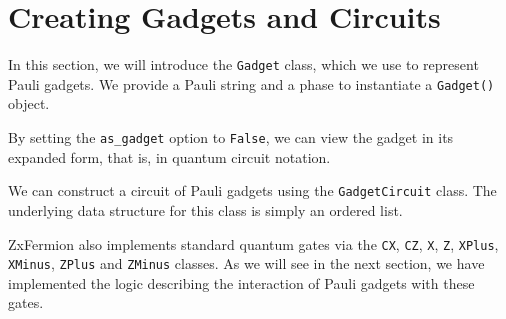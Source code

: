 \section{Creating Gadgets and Circuits}

In this section, we will introduce the \lstinline{Gadget} class, which we use to represent Pauli gadgets. We provide a Pauli string and a phase to instantiate a \lstinline{Gadget()} object.


By setting the \lstinline{as_gadget} option to \lstinline{False}, we can view the gadget in its expanded form, that is, in quantum circuit notation.


We can construct a circuit of Pauli gadgets using the \lstinline{GadgetCircuit} class. The underlying data structure for this class is simply an ordered list.


ZxFermion also implements standard quantum gates via the \lstinline{CX}, \lstinline{CZ}, \lstinline{X}, \lstinline{Z}, \lstinline{XPlus}, \lstinline{XMinus}, \lstinline{ZPlus} and \lstinline{ZMinus} classes. As we will see in the next section, we have implemented the logic describing the interaction of Pauli gadgets with these gates.



